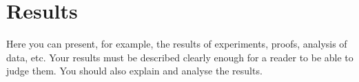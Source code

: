 \section{Results}

Here you can present, for example, the results of experiments, proofs, analysis of data, etc. Your results must be described clearly enough for a reader to be able to judge them.  You should also explain and analyse the results.


